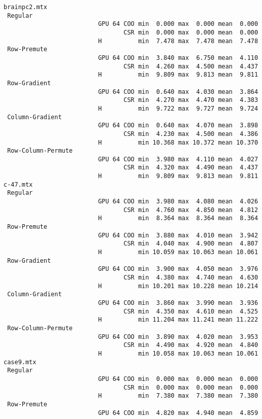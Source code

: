 {\begin{verbatim}
brainpc2.mtx
 Regular
                          GPU 64 COO min  0.000 max  0.000 mean  0.000
                                 CSR min  0.000 max  0.000 mean  0.000
                          H          min  7.478 max  7.478 mean  7.478
 Row-Premute
                          GPU 64 COO min  3.840 max  6.750 mean  4.110
                                 CSR min  4.260 max  4.500 mean  4.437
                          H          min  9.809 max  9.813 mean  9.811
 Row-Gradient
                          GPU 64 COO min  0.640 max  4.030 mean  3.864
                                 CSR min  4.270 max  4.470 mean  4.383
                          H          min  9.722 max  9.727 mean  9.724
 Column-Gradient
                          GPU 64 COO min  0.640 max  4.070 mean  3.898
                                 CSR min  4.230 max  4.500 mean  4.386
                          H          min 10.368 max 10.372 mean 10.370
 Row-Column-Permute
                          GPU 64 COO min  3.980 max  4.110 mean  4.027
                                 CSR min  4.320 max  4.490 mean  4.437
                          H          min  9.809 max  9.813 mean  9.811
c-47.mtx
 Regular
                          GPU 64 COO min  3.980 max  4.080 mean  4.026
                                 CSR min  4.760 max  4.850 mean  4.812
                          H          min  8.364 max  8.364 mean  8.364
 Row-Premute
                          GPU 64 COO min  3.880 max  4.010 mean  3.942
                                 CSR min  4.040 max  4.900 mean  4.807
                          H          min 10.059 max 10.063 mean 10.061
 Row-Gradient
                          GPU 64 COO min  3.900 max  4.050 mean  3.976
                                 CSR min  4.380 max  4.740 mean  4.630
                          H          min 10.201 max 10.228 mean 10.214
 Column-Gradient
                          GPU 64 COO min  3.860 max  3.990 mean  3.936
                                 CSR min  4.350 max  4.610 mean  4.525
                          H          min 11.204 max 11.241 mean 11.222
 Row-Column-Permute
                          GPU 64 COO min  3.890 max  4.020 mean  3.953
                                 CSR min  4.490 max  4.920 mean  4.840
                          H          min 10.058 max 10.063 mean 10.061
case9.mtx
 Regular
                          GPU 64 COO min  0.000 max  0.000 mean  0.000
                                 CSR min  0.000 max  0.000 mean  0.000
                          H          min  7.380 max  7.380 mean  7.380
 Row-Premute
                          GPU 64 COO min  4.820 max  4.940 mean  4.859

\end{verbatim}}

